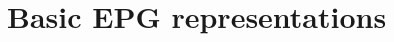 \documentclass[preprint,12pt]{elsarticle} %
\newtheorem{lema}[theorem]{Lemma}
\newtheorem{coro}[theorem]{Corollary}
\begin{document}
\section{Basic EPG representations}




\end{document}

